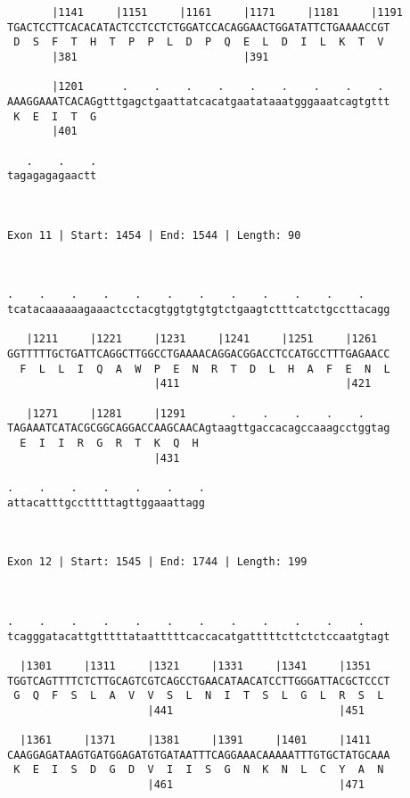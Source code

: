 \documentclass{article}
\begin{document}
{\begin{Verbatim}
       |1141     |1151     |1161     |1171     |1181     |1191
TGACTCCTTCACACATACTCCTCCTCTGGATCCACAGGAACTGGATATTCTGAAAACCGT
 D  S  F  T  H  T  P  P  L  D  P  Q  E  L  D  I  L  K  T  V 
       |381                          |391                   
  
       |1201      .    .    .    .    .    .    .    .    . 
AAAGGAAATCACAGgtttgagctgaattatcacatgaatataaatgggaaatcagtgttt
 K  E  I  T  G                                              
       |401                                                 
  
   .    .    .
tagagagagaactt
              
              
 
Exon 11 | Start: 1454 | End: 1544 | Length: 90



.    .    .    .    .    .    .    .    .    .    .    .    
tcatacaaaaaagaaactcctacgtggtgtgtgtctgaagtctttcatctgccttacagg
                                                            
   |1211     |1221     |1231     |1241     |1251     |1261  
GGTTTTTGCTGATTCAGGCTTGGCCTGAAAACAGGACGGACCTCCATGCCTTTGAGAACC
  F  L  L  I  Q  A  W  P  E  N  R  T  D  L  H  A  F  E  N  L
                       |411                          |421   
  
   |1271     |1281     |1291       .    .    .    .    .    
TAGAAATCATACGCGGCAGGACCAAGCAACAgtaagttgaccacagccaaagcctggtag
  E  I  I  R  G  R  T  K  Q  H                              
                       |431                                 
  
.    .    .    .    .    .    .
attacatttgcctttttagttggaaattagg
                               
                               
 
Exon 12 | Start: 1545 | End: 1744 | Length: 199



.    .    .    .    .    .    .    .    .    .    .    .    
tcagggatacattgtttttataatttttcaccacatgatttttcttctctccaatgtagt
                                                            
  |1301     |1311     |1321     |1331     |1341     |1351   
TGGTCAGTTTTCTCTTGCAGTCGTCAGCCTGAACATAACATCCTTGGGATTACGCTCCCT
 G  Q  F  S  L  A  V  V  S  L  N  I  T  S  L  G  L  R  S  L 
                      |441                          |451    
  
  |1361     |1371     |1381     |1391     |1401     |1411   
CAAGGAGATAAGTGATGGAGATGTGATAATTTCAGGAAACAAAAATTTGTGCTATGCAAA
 K  E  I  S  D  G  D  V  I  I  S  G  N  K  N  L  C  Y  A  N 
                      |461                          |471    
  

\end{Verbatim}}
\end{document}
